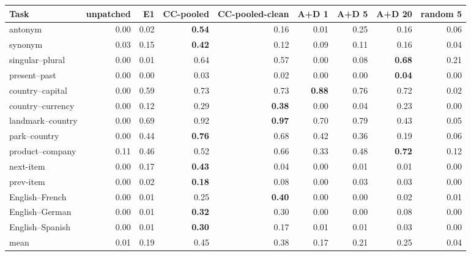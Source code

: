 \begin{tabular}{lrrrrrrrr}
\toprule
Task & unpatched & E1 & CC-pooled & CC-pooled-clean & A+D 1 & A+D 5 & A+D 20 & random 5 \\
\midrule
antonym & 0.00 & 0.02 & \textbf{0.54} & 0.16 & 0.01 & 0.25 & 0.16 & 0.06 \\
synonym & 0.03 & 0.15 & \textbf{0.42} & 0.12 & 0.09 & 0.11 & 0.16 & 0.04 \\
singular--plural & 0.00 & 0.01 & 0.64 & 0.57 & 0.00 & 0.08 & \textbf{0.68} & 0.21 \\
present--past & 0.00 & 0.00 & 0.03 & 0.02 & 0.00 & 0.00 & \textbf{0.04} & 0.00 \\
country--capital & 0.00 & 0.59 & 0.73 & 0.73 & \textbf{0.88} & 0.76 & 0.72 & 0.02 \\
country--currency & 0.00 & 0.12 & 0.29 & \textbf{0.38} & 0.00 & 0.04 & 0.23 & 0.00 \\
landmark--country & 0.00 & 0.69 & 0.92 & \textbf{0.97} & 0.70 & 0.79 & 0.43 & 0.05 \\
park--country & 0.00 & 0.44 & \textbf{0.76} & 0.68 & 0.42 & 0.36 & 0.19 & 0.06 \\
product--company & 0.11 & 0.46 & 0.52 & 0.66 & 0.33 & 0.48 & \textbf{0.72} & 0.12 \\
next-item & 0.00 & 0.17 & \textbf{0.43} & 0.04 & 0.00 & 0.01 & 0.01 & 0.00 \\
prev-item & 0.00 & 0.02 & \textbf{0.18} & 0.08 & 0.00 & 0.03 & 0.03 & 0.00 \\
English--French & 0.00 & 0.01 & 0.25 & \textbf{0.40} & 0.00 & 0.00 & 0.02 & 0.01 \\
English--German & 0.00 & 0.01 & \textbf{0.32} & 0.30 & 0.00 & 0.00 & 0.08 & 0.00 \\
English--Spanish & 0.00 & 0.01 & \textbf{0.30} & 0.17 & 0.01 & 0.01 & 0.03 & 0.00 \\
\midrule
mean & 0.01 & 0.19 & 0.45 & 0.38 & 0.17 & 0.21 & 0.25 & 0.04 \\
\bottomrule
\end{tabular}
